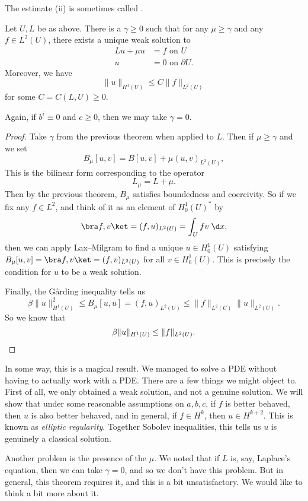 \documentclass[a4paper]{article}
\begin{document}
The estimate (ii) is sometimes called .

\begin{thm}
  Let $U, L$ be as above. There is a $\gamma \geq 0$ such that for any $\mu \geq \gamma$ and any $f \in L^2(U)$, there exists a unique weak solution to
  \begin{align*}
    Lu + \mu u &= f \text{ on $U$}\\
    u &= 0 \text{ on $\partial U$}.
  \end{align*}
  Moreover, we have
  \[
    \|u\|_{H^1(U)} \leq C \|f\|_{L^2(U)}
  \]
  for some $C = C(L, U) \geq 0$.

  Again, if $b^i \equiv 0$ and $c \geq 0$, then we may take $\gamma = 0$.
\end{thm}

\begin{proof}
  Take $\gamma$ from the previous theorem when applied to $L$. Then if $\mu \geq \gamma$ and we set
  \[
    B_\mu[u, v] = B[u, v] + \mu (u, v)_{L^2(U)},
  \]
  This is the bilinear form corresponding to the operator
  \[
    L_\mu = L + \mu.
  \]
  Then by the previous theorem, $B_\mu$ satisfies boundedness and coercivity. So if we fix any $f \in L^2$, and think of it as an element of $H_0^1(U)^*$ by
  \[
    \bra f, v \ket = (f, u)_{L^2(U)} = \int_U fv\;\d x,
  \]
  then we can apply Lax--Milgram to find a unique $u \in H_0^1(U)$ satisfying $B_\mu[u, v] = \bra f, v\ket = (f, v)_{L^2(U)}$ for all $v \in H_0^1(U)$. This is precisely the condition for $u$ to be a weak solution.

  Finally, the G\r{a}rding inequality tells us
  \[
    \beta \|u\|_{H^1(U)}^2 \leq B_\mu[u, u] = (f, u)_{L^2(U)} \leq \|f\|_{L^2(U)} \|u\|_{L^2(U)}.
  \]
  So we know that
  \[
    \beta \|u\|_{H^1(U)} \leq \|f\|_{L^2(U)}.\qedhere
  \]
\end{proof}
In some way, this is a magical result. We managed to solve a PDE without having to actually work with a PDE. There are a few things we might object to. First of all, we only obtained a weak solution, and not a genuine solution. We will show that under some reasonable assumptions on $a, b, c$, if $f$ is better behaved, then $u$ is also better behaved, and in general, if $f \in H^k$, then $u \in H^{k + 2}$. This is known as \emph{elliptic regularity}. Together Sobolev inequalities, this tells us $u$ is genuinely a classical solution.

Another problem is the presence of the $\mu$. We noted that if $L$ is, say, Laplace's equation, then we can take $\gamma = 0$, and so we don't have this problem. But in general, this theorem requires it, and this is a bit unsatisfactory. We would like to think a bit more about it.
\end{document}
